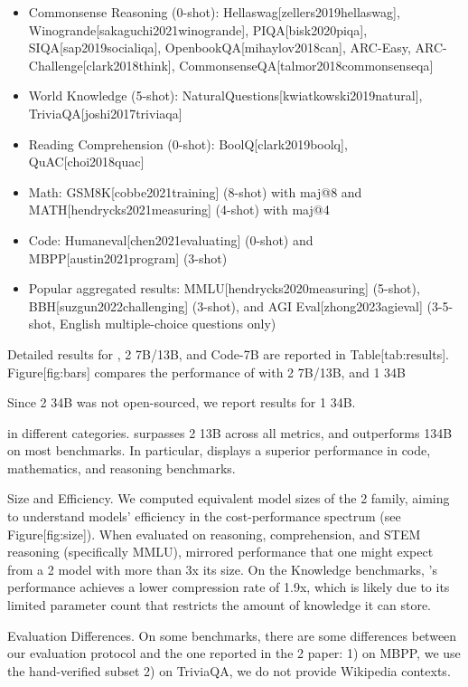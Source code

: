 \documentclass[11pt,a4paper]{article}
\begin{document}
\begin{itemize}
\item Commonsense Reasoning (0-shot): Hellaswag[zellers2019hellaswag], Winogrande[sakaguchi2021winogrande], PIQA[bisk2020piqa], SIQA[sap2019socialiqa], OpenbookQA[mihaylov2018can], ARC-Easy, ARC-Challenge[clark2018think], CommonsenseQA[talmor2018commonsenseqa]
\item World Knowledge (5-shot): NaturalQuestions[kwiatkowski2019natural], TriviaQA[joshi2017triviaqa]
\item Reading Comprehension (0-shot): BoolQ[clark2019boolq], QuAC[choi2018quac]
\item Math: GSM8K[cobbe2021training] (8-shot) with maj@8 and MATH[hendrycks2021measuring] (4-shot) with maj@4
\item Code: Humaneval[chen2021evaluating] (0-shot) and MBPP[austin2021program] (3-shot)
\item Popular aggregated results: MMLU[hendrycks2020measuring] (5-shot), BBH[suzgun2022challenging] (3-shot), and AGI Eval[zhong2023agieval] (3-5-shot, English multiple-choice questions only)
\end{itemize}

Detailed results for , 2 7B/13B, and Code-7B are reported in Table[tab:results].
Figure[fig:bars] compares the performance of with 2 7B/13B, and 1 34B

Since 2 34B was not open-sourced, we report results for 1 34B.

in different categories.
surpasses 2 13B across all metrics, and outperforms 134B on most benchmarks.
In particular, displays a superior performance in code, mathematics, and reasoning benchmarks.

Size and Efficiency. We computed equivalent model sizes of the 2 family, aiming to understand models' efficiency in the cost-performance spectrum (see Figure[fig:size]). When evaluated on reasoning, comprehension, and STEM reasoning (specifically MMLU), mirrored performance that one might expect from a 2 model with more than 3x its size. On the Knowledge benchmarks, 's performance achieves a lower compression rate of 1.9x, which is likely due to its limited parameter count that restricts the amount of knowledge it can store.

Evaluation Differences. On some benchmarks, there are some differences between our evaluation protocol and the one reported in the 2 paper: 1) on MBPP, we use the hand-verified subset 2) on TriviaQA, we do not provide Wikipedia contexts.
\end{document}
